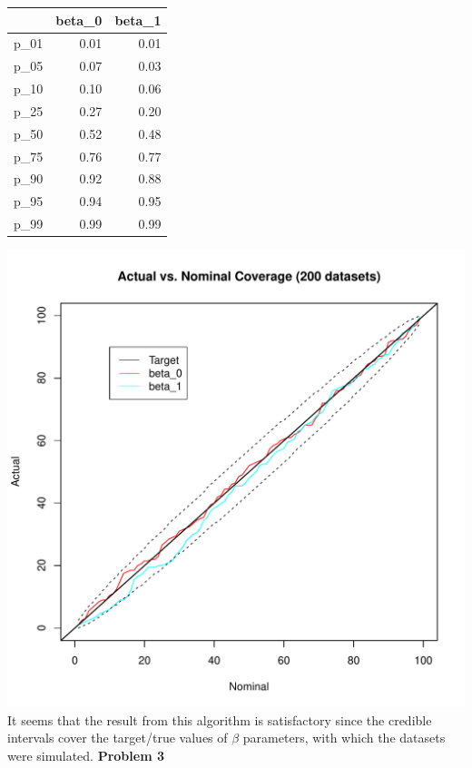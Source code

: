 \documentclass[12pt]{article}
\begin{document}
\begin{table}[ht]
\centering
\begin{tabular}{rrr}
  \hline
 & beta\_0 & beta\_1 \\ 
  \hline
p\_01 & 0.01 & 0.01 \\ 
  p\_05 & 0.07 & 0.03 \\ 
  p\_10 & 0.10 & 0.06 \\ 
  p\_25 & 0.27 & 0.20 \\ 
  p\_50 & 0.52 & 0.48 \\ 
  p\_75 & 0.76 & 0.77 \\ 
  p\_90 & 0.92 & 0.88 \\ 
  p\_95 & 0.94 & 0.95 \\ 
  p\_99 & 0.99 & 0.99 \\ 
   \hline
\end{tabular}
\end{table}
\newline
\includegraphics[width=\textwidth]{coverage_line_plot.pdf}
\newline
It seems that the result from this algorithm is satisfactory since the credible intervals cover the target/true values of $\beta$ parameters, with which the datasets were simulated.
\newline \newline
\textbf{Problem 3} \newline
\end{document}

